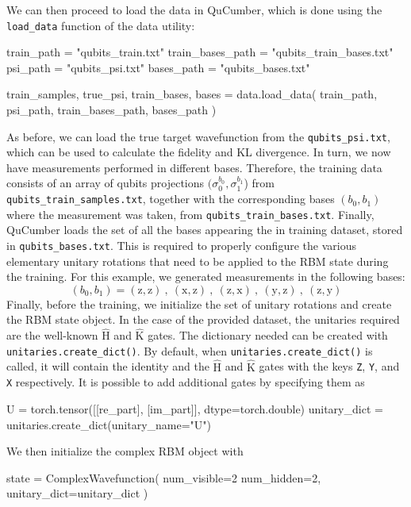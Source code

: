 \documentclass[submission, Phys, hidelinks]{SciPost}
\begin{document}
We can then proceed to load the data in QuCumber, which is done using the \verb|load_data| function of the data utility:
\begin{python}
train_path = "qubits_train.txt"
train_bases_path = "qubits_train_bases.txt"
psi_path = "qubits_psi.txt"
bases_path = "qubits_bases.txt"

train_samples, true_psi, train_bases, bases = data.load_data(
  train_path, psi_path, train_bases_path, bases_path
)
\end{python}
As before, we can load the true target wavefunction from the \verb|qubits_psi.txt|, which can be used to calculate the fidelity and KL divergence. In turn, we now have measurements performed in different bases. Therefore, the training data consists of an array of qubits projections $(\sigma_0^{b_0},\sigma_1^{b_1}$) from \verb|qubits_train_samples.txt|, together with the corresponding bases $(b_0,b_1)$ where the measurement was taken, from \verb|qubits_train_bases.txt|. Finally, QuCumber loads the set of all the bases appearing the in training dataset, stored in \verb|qubits_bases.txt|. This is required to properly configure the various elementary unitary rotations that need to be applied to the RBM state during the training. For this example, we generated measurements in the following bases:
\begin{equation}
	(b_0, b_1)=(\mathrm{z},\mathrm{z})\:,\:(\mathrm{x},\mathrm{z})\:,\:(\mathrm{z},\mathrm{x})\:,\:(\mathrm{y},\mathrm{z})\:,\:(\mathrm{z},\mathrm{y})
\end{equation}
Finally, before the training, we initialize the set of unitary rotations and create the RBM state object. In the case of the provided dataset, the unitaries required are the well-known $\hat{\mathrm{H}}$ and $\hat{\mathrm{K}}$ gates. The dictionary needed can be created with \verb|unitaries.create_dict()|. 
By default, when \verb|unitaries.create_dict()| is called, it will contain the identity and the $\hat{\mathrm{H}}$ and $\hat{\mathrm{K}}$ gates with the keys \verb|Z|, \verb|Y|, and \verb|X| respectively. It is possible to add additional gates by specifying them as 
\begin{python}
U = torch.tensor([[re_part], [im_part]], dtype=torch.double)
unitary_dict = unitaries.create_dict(unitary_name="U")
\end{python}

We then initialize the complex RBM object with
\begin{python}
state = ComplexWavefunction(
   num_visible=2 num_hidden=2, unitary_dict=unitary_dict
)
\end{python}
\end{document}
